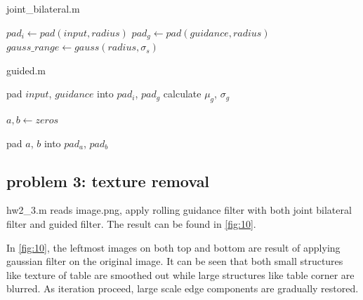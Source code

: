 \documentclass[extendedabs]{bmvc2k}
\begin{document}
\begin{algorithm}
    \caption{joint\_bilateral.m}
    $pad_{i} \gets pad(input, radius)$\;
    $pad_{g} \gets pad(guidance, radius)$\;
    $gauss\_range \gets gauss(radius, \sigma_s)$\;
    
\end{algorithm}

\begin{algorithm}
    \caption{guided.m}
    pad $input$, $guidance$ into $pad_{i}$, $pad_{g}$\;
    calculate $\mu_{g}$, $\sigma_{g}$\;

    $a, b \gets zeros$\;
    
    pad $a$, $b$ into $pad_{a}$, $pad_{b}$\;
\end{algorithm}

\subsection*{problem 3: texture removal}

hw2\_3.m reads image.png, apply rolling guidance filter with both joint bilateral filter
and guided filter. The result can be found in \figurename{\ref{fig:10}}.

In \figurename{\ref{fig:10}}, the leftmost images on both top and bottom are result of 
applying gaussian filter on the original image. It can be seen that both small structures like
texture of table are smoothed out while large structures like table corner are
blurred. As iteration proceed, large scale edge components are gradually restored.
\end{document}
